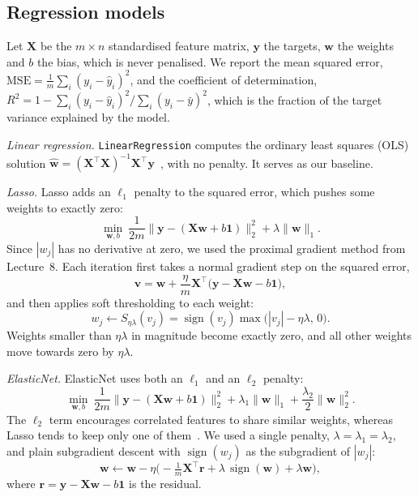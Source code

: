 \documentclass[conference]{IEEEtran}
\DeclareMathOperator{\sign}{sign}
\newcommand{\vect}[1]{\mathbf{#1}}
\begin{document}
\subsection{Regression models}
Let $\vect{X}$ be the $m\times n$ standardised feature matrix, $\vect{y}$ the targets, $\vect{w}$ the weights and $b$ the bias, which is never penalised. We report the mean squared error, $\mathrm{MSE}=\frac{1}{m}\sum_i(y_i-\hat y_i)^2$, and the coefficient of determination, $R^2=1-\sum_i(y_i-\hat y_i)^2/\sum_i(y_i-\bar y)^2$, which is the fraction of the target variance explained by the model.

\textit{Linear regression.} \texttt{LinearRegression} computes the ordinary least squares (OLS) solution $\hat{\vect{w}}=(\vect{X}^\top\vect{X})^{-1}\vect{X}^\top\vect{y}$~\cite{notes}, with no penalty. It serves as our baseline.

\textit{Lasso.} Lasso adds an $\ell_1$ penalty to the squared error, which pushes some weights to exactly zero:
\begin{equation}
\min_{\vect{w},b}\ \frac{1}{2m}\|\vect{y}-(\vect{X}\vect{w}+b\vect{1})\|_2^2+\lambda\|\vect{w}\|_1 .
\label{eq:lasso}
\end{equation}
Since $|w_j|$ has no derivative at zero, we used the proximal gradient method from Lecture~8. Each iteration first takes a normal gradient step on the squared error,
\begin{equation}
\vect{v}=\vect{w}+\frac{\eta}{m}\vect{X}^\top\big(\vect{y}-\vect{X}\vect{w}-b\vect{1}\big),
\end{equation}
and then applies soft thresholding to each weight:
\begin{equation}
w_j\leftarrow S_{\eta\lambda}(v_j)=\sign(v_j)\max\big(|v_j|-\eta\lambda,\,0\big).
\label{eq:soft}
\end{equation}
Weights smaller than $\eta\lambda$ in magnitude become exactly zero, and all other weights move towards zero by $\eta\lambda$.

\textit{ElasticNet.} ElasticNet uses both an $\ell_1$ and an $\ell_2$ penalty:
\begin{equation}
\min_{\vect{w},b}\ \frac{1}{2m}\|\vect{y}-(\vect{X}\vect{w}+b\vect{1})\|_2^2+\lambda_1\|\vect{w}\|_1+\frac{\lambda_2}{2}\|\vect{w}\|_2^2 .
\label{eq:enet}
\end{equation}
The $\ell_2$ term encourages correlated features to share similar weights, whereas Lasso tends to keep only one of them~\cite{notes}. We used a single penalty, $\lambda=\lambda_1=\lambda_2$, and plain subgradient descent with $\sign(w_j)$ as the subgradient of $|w_j|$:
\begin{equation}
\vect{w}\leftarrow\vect{w}-\eta\Big(-\tfrac{1}{m}\vect{X}^\top\vect{r}+\lambda\,\sign(\vect{w})+\lambda\vect{w}\Big),
\end{equation}
where $\vect{r}=\vect{y}-\vect{X}\vect{w}-b\vect{1}$ is the residual.
\end{document}
